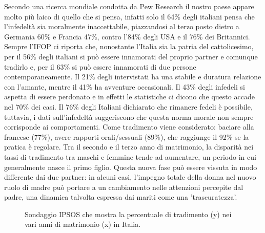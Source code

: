 \documentclass[12pt]{book} %
\begin{document}
Secondo una ricerca mondiale condotta da Pew Research il nostro paese appare molto più laico di quello che si pensa, infatti solo il 64\% degli italiani pensa che l'infedeltà sia moralmente inaccettabile, piazzandosi al terzo posto dietro a Germania 60\% e Francia 47\%, contro l'84\% degli USA e il 76\% dei Britannici. Sempre l'IFOP ci riporta che, nonostante l'Italia sia la patria del cattolicesimo, per il 56\% degli italiani si può essere innamorati del proprio partner e comunque tradirlo e, per il 63\% si può essere innamorati di due persone contemporaneamente. Il 21\% degli intervistati ha una stabile e duratura relazione con l'amante, mentre il 41\% ha avventure occasionali. Il 43\% degli infedeli si aspetta di essere perdonato e in effetti le statistiche ci dicono che questo accade nel 70\% dei casi. Il 76\% degli Italiani dichiarato che rimanere fedeli è possibile, tuttavia, i dati sull’infedeltà suggeriscono che questa norma morale non sempre corrisponde ai comportamenti. Come tradimento viene considerato: baciare alla francese (77\%), avere rapporti orali/sessuali (89\%), che raggiunge il 92\% se la pratica è regolare. 
Tra il secondo e il terzo anno di matrimonio, la disparità nei tassi di tradimento tra maschi e femmine tende ad aumentare, un periodo in cui generalmente nasce il primo figlio. Questa nuova fase può essere vissuta in modo differente dai due partner: in alcuni casi, l'impegno totale della donna nel nuovo ruolo di madre può portare a un cambiamento nelle attenzioni percepite dal padre, una dinamica talvolta espressa dai mariti come una 'trascuratezza'.

\needspace{4cm}
\begin{figure}[H]
  \centering
  \caption{Sondaggio IPSOS che mostra la percentuale di tradimento (y) nei vari anni di matrimonio (x) in Italia.}
\end{figure}
\end{document}
